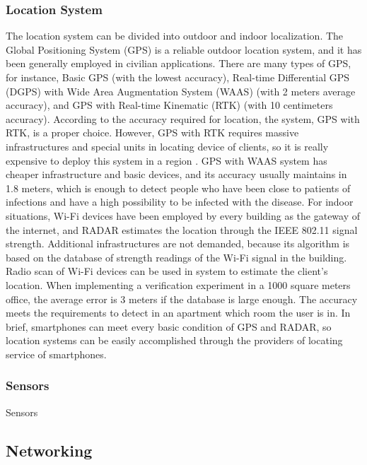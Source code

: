 \documentclass[10pt,journal,final,a4paper,nofonttune]{IEEEtran}
\begin{document}
\subsubsection{Location System}
The location system can be divided into outdoor and indoor localization. The Global Positioning System (GPS) is a reliable outdoor location system, and it has been generally employed in civilian applications. There are many types of GPS, for instance, Basic GPS (with the lowest accuracy), Real-time Differential GPS (DGPS) with Wide Area Augmentation System (WAAS) (with 2 meters average accuracy), and GPS with Real-time Kinematic (RTK) (with 10 centimeters accuracy)\cite{lamarca2008location}. According to the accuracy required for location, the system, GPS with RTK, is a proper choice. However, GPS with RTK requires massive infrastructures and special units in locating device of clients, so it is really expensive to deploy this system in a region \cite{lamarca2008location}. GPS with WAAS system has cheaper infrastructure and basic devices, and its accuracy usually maintains in 1.8 meters\cite{youssef2003wlan}, which is enough to detect people who have been close to patients of infections and have a high possibility to be infected with the disease. For indoor situations, Wi-Fi devices have been employed by every building as the gateway of the internet, and RADAR estimates the location through the IEEE 802.11 signal strength\cite{lamarca2008location}. Additional infrastructures are not demanded, because its algorithm is based on the database of strength readings of the Wi-Fi signal in the building. Radio scan of Wi-Fi devices can be used in system to estimate the client’s location. When implementing a verification experiment in a 1000 square meters office, the average error is 3 meters if the database is large enough\cite{bahl2000radar}. The accuracy meets the requirements to detect in an apartment which room the user is in. In brief, smartphones can meet every basic condition of GPS and RADAR, so location systems can be easily accomplished through the providers of locating service of smartphones.
\subsubsection{Sensors}
Sensors 




\subsection{Networking}
\end{document}
